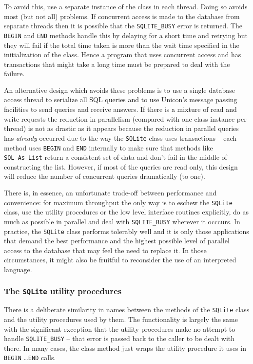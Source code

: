 To avoid this, use a separate instance of the class in each thread. Doing so
avoids most (but not all) problems. If concurrent access is made to the database
from separate threads then it is possible that the \texttt{SQLITE\_BUSY} error
is returned.  The \texttt{BEGIN} and \texttt{END} methods handle this by
delaying for a short time and retrying but they will fail if the total time
taken is more than the wait time specified in the initialization of the
\label{SQLite_Timeout}
class. Hence a program that uses concurrent access and has transactions that
might take a long time must be prepared to deal with the failure.

An alternative design which avoids these problems is to use a single database
access thread to serialize all SQL queries and to use Unicon's message passing
facilities to send queries and receive answers.  If there is a mixture of read
and write requests the reduction in parallelism (compared with one class
instance per thread) is not as drastic as it appears because the reduction in
parallel queries has {\em already\/} occurred due to the way the \texttt{SQLite}
class uses transactions -- each method uses \texttt{BEGIN} and \texttt{END}
internally to make sure that methods like \texttt{SQL\_As\_List} return a
consistent set of data and don't fail in the middle of constructing the list.
However, if most of the queries are read only, this design will reduce the number
of concurrent queries dramatically (to one).

There is, in essence, an unfortunate trade-off between performance and
convenience: for maximum throughput the only way is to eschew the
\texttt{SQLite} class, use the utility procedures or the low level interface
routines explicitly, do as much as possible in parallel and deal with
\texttt{SQLITE\_BUSY} wherever it occcurs.  In practice, the \texttt{SQLite}
class performs tolerably well and it is only those applications that demand the
best performance and the highest possible level of parallel access to the
database that may feel the need to replace it. In those circumstances, it
might also be fruitful to reconsider the use of an interpreted language.

\subsubsection{The \texttt{SQLite} utility procedures}
There is a deliberate similarity in names between the methods of the
\texttt{SQLite} class and the utility procedures used by them. The functionality
is largely the same with the significant exception that the utility procedures
make no attempt to handle \texttt{SQLITE\_BUSY} -- that error is passed back
to the caller to be dealt with there. In many cases, the class method just
wraps the utility procedure it uses in \texttt{BEGIN} \ldots \texttt{END} calls.

